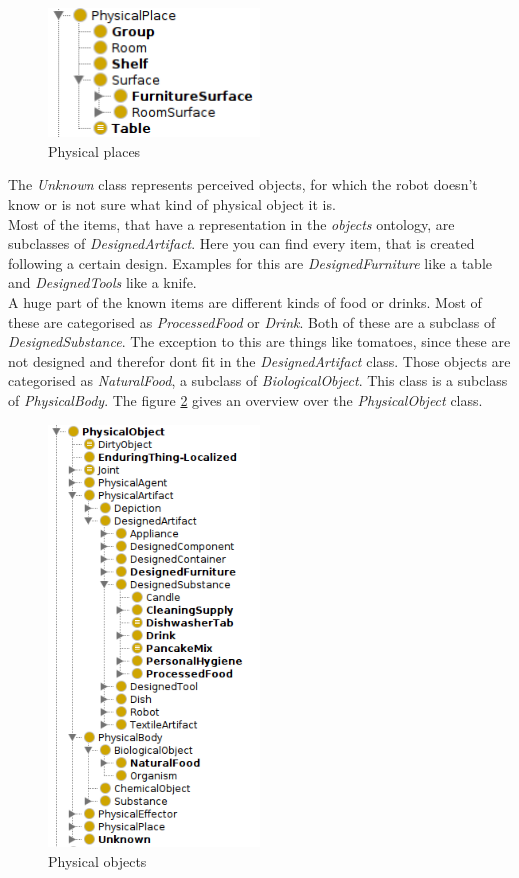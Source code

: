 \documentclass[main.tex]{subfiles}
\begin{document}
\begin{figure}
\centering
\includegraphics[width=0.5\textwidth]{pictures/ontology/Ontologie_place}
\caption{Physical places}
\label{fig:place_ont}
\end{figure}

The \textit{Unknown} class represents perceived objects, for which the robot doesn't know or is not sure what kind of physical object it is.\\
Most of the items, that have a representation in the \textit{objects} ontology, are subclasses of \textit{DesignedArtifact}.
Here you can find every item, that is created following a certain design. 
Examples for this are \textit{DesignedFurniture} like a table and \textit{DesignedTools} like a knife.\\
A huge part of the known items are different kinds of food or drinks. Most of these are categorised as \textit{ProcessedFood} or \textit{Drink}. Both of these are a subclass of \textit{DesignedSubstance}. The exception to this are things like tomatoes, since these are not designed and therefor dont fit in the \textit{DesignedArtifact} class. Those objects are categorised as \textit{NaturalFood}, a subclass of \textit{BiologicalObject}. This class is a subclass of \textit{PhysicalBody}. The figure \ref{fig:object_ont} gives an overview over the \textit{PhysicalObject} class.

\begin{figure}
\centering
\includegraphics[width=0.5\textwidth]{pictures/ontology/Ontologie_objects}
\caption{Physical objects}
\label{fig:object_ont}
\end{figure}
\end{document}
